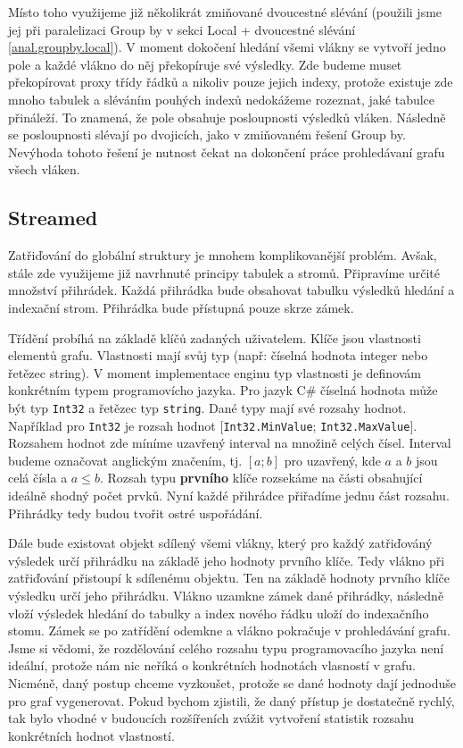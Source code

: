 Místo toho využijeme již několikrát zmiňované dvoucestné slévání (použili jsme jej při paralelizaci Group by v sekci Local + dvoucestné slévání \ref{anal.groupby.local}).
V moment dokočení hledání všemi vlákny se vytvoří jedno pole a každé vlákno do něj překopíruje své výsledky.
Zde budeme muset překopírovat proxy třídy řádků a nikoliv pouze jejich indexy, protože existuje zde mnoho tabulek a sléváním pouhých indexů nedokážeme rozeznat, jaké tabulce přináleží.
To znamená, že pole obsahuje posloupnosti výsledků vláken.
Následně se posloupnosti slévají po dvojicích, jako v zmiňovaném řešení Group by. 
Nevýhoda tohoto řešení je nutnost čekat na dokončení práce prohledávaní grafu všech vláken.
 
\subsection{Streamed}

Zatřiďování do globální struktury je mnohem komplikovanější problém.
Avšak, stále zde využijeme již navrhnuté principy tabulek a stromů.
Připravíme určité množství přihrádek.
Každá přihrádka bude obsahovat tabulku výsledků hledání a indexační strom.
Přihrádka bude přístupná pouze skrze zámek.

Třídění probíhá na základě klíčů zadaných uživatelem.
Klíče jsou vlastnosti elementů grafu.
Vlastnosti mají svůj typ (např: číselná hodnota integer nebo řetězec string).
V moment implementace enginu typ vlastnosti je definovám konkrétním typem programovícho jazyka.
Pro jazyk C\# číselná hodnota může být typ \texttt{Int32} a řetězec typ \texttt{string}.
Dané typy mají své rozsahy hodnot.
Například pro \texttt{Int32} je rozsah hodnot $[$\texttt{Int32.MinValue}; \texttt{Int32.MaxValue}$]$.
Rozsahem hodnot zde míníme uzavřený interval na množině celých čísel.
Interval budeme označovat anglickým značením, tj. $[a; b]$ pro uzavřený, kde $a$ a $b$ jsou celá čísla a $a\leq b$.
Rozsah typu \textbf{prvního} klíče rozsekáme na části obsahující ideálně shodný počet prvků. 
Nyní každé přihrádce přiřadíme jednu část rozsahu. 
Přihrádky tedy budou tvořit ostré uspořádání.

Dále bude existovat objekt sdílený všemi vlákny, který pro každý zatřiďováný výsledek určí přihrádku na základě jeho hodnoty prvního klíče.
Tedy vlákno při zatřiďování přistoupí k sdílenému objektu.
Ten na základě hodnoty prvního klíče výsledku určí jeho přihrádku.
Vlákno uzamkne zámek dané přihrádky, následně vloží výsledek hledání do tabulky a index nového řádku uloží do indexačního stomu.
Zámek se po zatřídění odemkne a vlákno pokračuje v prohledávání grafu.
Jsme si vědomi, že rozdělování celého rozsahu typu programovacího jazyka není ideální, protože nám nic neříká o konkrétních hodnotách vlasností v grafu.
Nicméně, daný postup chceme vyzkoušet, protože se dané hodnoty dají jednoduše pro graf vygenerovat.
Pokud bychom zjistili, že daný přístup je dostatečně rychlý, tak bylo vhodné v budoucích rozšířeních zvážit vytvoření statistik rozsahu konkrétních hodnot vlastností.

